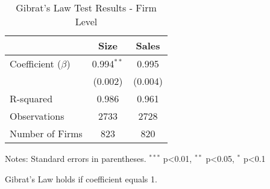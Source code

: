 \begin{table}[htbp]
\centering
\caption{Gibrat's Law Test Results - Firm Level}
\label{tab:gibrat_firm}
\begin{tabular}{lcc}
\hline\hline
& Size & Sales \\
\hline
Coefficient ($\beta$) & 0.994$^{**}$ & 0.995 \\
& (0.002) & (0.004) \\
R-squared & 0.986 & 0.961 \\
Observations & 2733 & 2728 \\
Number of Firms & 823 & 820 \\
\hline\hline
\end{tabular}
\begin{tablenotes}
\small
\item Notes: Standard errors in parentheses. $^{***}$ p<0.01, $^{**}$ p<0.05, $^{*}$ p<0.1
\item Gibrat's Law holds if coefficient equals 1.
\end{tablenotes}
\end{table}